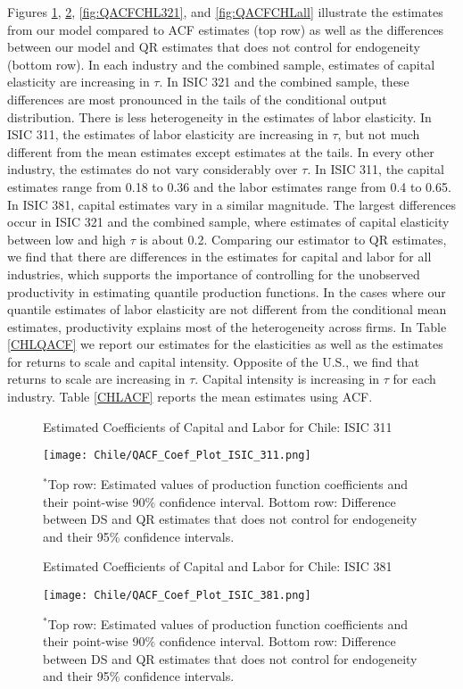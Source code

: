 \documentclass[12pt]{article}
\begin{document}
Figures \ref{fig:QACFCHL311}, \ref{fig:QACFCHL381}, \ref{fig:QACFCHL321}, and  \ref{fig:QACFCHLall} illustrate the estimates from our model compared to ACF estimates (top row) as well as the differences between our model and QR estimates that does not control for endogeneity (bottom row). In each industry and the combined sample, estimates of capital elasticity are increasing in $\tau$. In ISIC 321 and the combined sample, these differences are most pronounced in the tails of the conditional output distribution. There is less heterogeneity in the estimates of labor elasticity. In ISIC 311, the estimates of labor elasticity are increasing in $\tau$, but not much different from the mean estimates except estimates at the tails. In every other industry, the estimates do not vary considerably over $\tau$. In ISIC 311, the capital estimates range from 0.18 to 0.36 and the labor estimates range from 0.4 to 0.65. In ISIC 381, capital estimates vary in a similar magnitude. The largest differences occur in ISIC 321 and the combined sample, where estimates of capital elasticity between low and high $\tau$ is about 0.2. Comparing our estimator to QR estimates, we find that there are differences in the estimates for capital and labor for all industries, which supports the importance of controlling for the unobserved productivity in estimating quantile production functions. In the cases where our quantile estimates of labor elasticity are not different from the conditional mean estimates, productivity explains most of the heterogeneity across firms. In Table \ref{CHLQACF} we report our estimates for the elasticities as well as the estimates for returns to scale and capital intensity. Opposite of the U.S., we find that returns to scale are increasing in $\tau$. Capital intensity is increasing in $\tau$ for each industry. Table \ref{CHLACF} reports the mean estimates using ACF.

\begin{figure}[H]
\centering
\caption{Estimated Coefficients of Capital and Labor for Chile: ISIC 311}
\texttt{[image: Chile/QACF\_Coef\_Plot\_ISIC\_311.png]}
\caption*{\footnotesize $^{*}$Top row: Estimated values of production function coefficients and their point-wise 90\% confidence interval. Bottom row: Difference between DS and QR estimates that does not control for endogeneity and their 95\% confidence intervals.}
\label{fig:QACFCHL311}
\end{figure}

\begin{figure}[H]
\centering
\caption{Estimated Coefficients of Capital and Labor for Chile: ISIC 381}
\texttt{[image: Chile/QACF\_Coef\_Plot\_ISIC\_381.png]}
\caption*{\footnotesize $^{*}$Top row: Estimated values of production function coefficients and their point-wise 90\% confidence interval. Bottom row: Difference between DS and QR estimates that does not control for endogeneity and their 95\% confidence intervals.}
\label{fig:QACFCHL381}
\end{figure}
\end{document}
